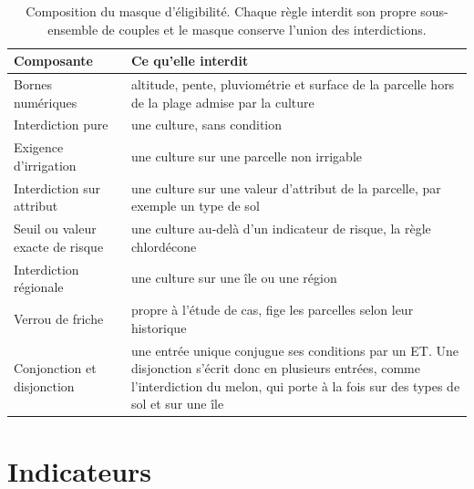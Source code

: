 \begin{table}[H]
  \centering
  \caption{Composition du masque d'éligibilité. Chaque règle interdit son propre sous-ensemble
  de couples et le masque conserve l'union des interdictions.}
  \label{tab:ann-eligibilite}
  \scriptsize
  \setlength{\tabcolsep}{4pt}
  \begin{tabularx}{\textwidth}{@{}>{\raggedright\arraybackslash}p{34mm}X@{}}
    \toprule
    \textbf{Composante} & \textbf{Ce qu'elle interdit} \\
    \midrule
    Bornes numériques & altitude, pente, pluviométrie et surface de la parcelle hors de la
      plage admise par la culture \\
    Interdiction pure & une culture, sans condition \\
    Exigence d'irrigation & une culture sur une parcelle non irrigable \\
    Interdiction sur attribut & une culture sur une valeur d'attribut de la parcelle, par
      exemple un type de sol \\
    Seuil ou valeur exacte de risque & une culture au-delà d'un indicateur de risque, la règle
      chlordécone \\
    Interdiction régionale & une culture sur une île ou une région \\
    Verrou de friche & propre à l'étude de cas, fige les parcelles selon leur historique \\
    \midrule
    Conjonction et disjonction & une entrée unique conjugue ses conditions par un ET. Une
      disjonction s'écrit donc en plusieurs entrées, comme l'interdiction du melon, qui porte à
      la fois sur des types de sol et sur une île \\
    \bottomrule
  \end{tabularx}
\end{table}

\section{Indicateurs}

